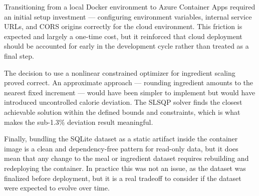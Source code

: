 Transitioning from a local Docker environment to Azure Container Apps required an
initial setup investment — configuring environment variables, internal service URLs,
and CORS origins correctly for the cloud environment. This friction is expected and
largely a one-time cost, but it reinforced that cloud deployment should be accounted
for early in the development cycle rather than treated as a final step.

The decision to use a nonlinear constrained optimizer for ingredient scaling proved
correct. An approximate approach — rounding ingredient amounts to the nearest fixed
increment — would have been simpler to implement but would have introduced uncontrolled
calorie deviation. The SLSQP solver finds the closest achievable solution within the
defined bounds and constraints, which is what makes the sub-1.3\% deviation result
meaningful.

Finally, bundling the SQLite dataset as a static artifact inside the container image
is a clean and dependency-free pattern for read-only data, but it does mean that any
change to the meal or ingredient dataset requires rebuilding and redeploying the
container. In practice this was not an issue, as the dataset was finalized before
deployment, but it is a real tradeoff to consider if the dataset were expected to
evolve over time.